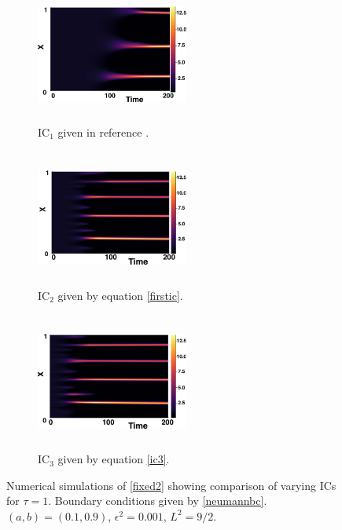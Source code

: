 \begin{figure}[H]
    \centering
    \begin{subfigure}[t]{0.32\textwidth}
        \centering
        \includegraphics[width=5cm,height=4.5cm]{gaff1.png}
        \caption{$\text{IC}_1$ given in reference \cite{gaffmonk}.}
        \label{}
    \end{subfigure}
    \hfill
    \begin{subfigure}[t]{0.32\textwidth}
        \centering
        \includegraphics[width=5cm,height=4.5cm]{ic21.png}
        \caption{$\text{IC}_2$ given by equation \eqref{firstic}.}
        \label{}
    \end{subfigure}
    \hfill
    \begin{subfigure}[t]{0.32\textwidth}
        \centering
        \includegraphics[width=5cm,height=4.5cm]{ic31.png}
        \caption{$\text{IC}_3$ given by equation \eqref{ic3}.}
        \label{}
    \end{subfigure}
    \caption{Numerical simulations of \eqref{fixed2} showing comparison of varying ICs for $\tau=1$. Boundary conditions given by \eqref{neumannbc}. $(a,b)=(0.1,0.9)$, $\epsilon^2=0.001$, $L^2=9/2$.}
    \label{fig:figtau1}
\end{figure}
